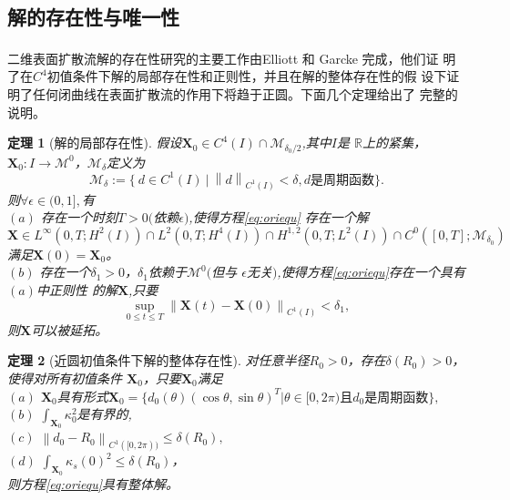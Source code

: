 \documentclass[a4paper,twoside]{ctexart}
\newtheorem{theorem}{定理}[section]
\begin{document}
\subsection{解的存在性与唯一性}
二维表面扩散流解的存在性研究的主要工作由Elliott 和 Garcke 完成\textsuperscript{\cite{ref1}}，他们证
明了在$C^4$初值条件下解的局部存在性和正则性，并且在解的整体存在性的假
设下证明了任何闭曲线在表面扩散流的作用下将趋于正圆。下面几个定理给出了
完整的说明。
\begin{theorem}[解的局部存在性]
  假设$\boldsymbol X_0\in C^4(I)\cap \mathcal{M}_{\delta_0/2}$,其中$I$是
  $\mathbb{R}$上的紧集，$\boldsymbol X_0:I\rightarrow \mathcal{M}^0$，$\mathcal{M}_{\delta}$定义为
  \begin{equation}
    \label{eq:mathcalM}
    \mathcal{M}_{\delta} := \{\ d \in C^1(I)\ |\ \left \|d  \right
    \|_{C^1(I)}<\delta ,  d \text{是周期函数}\}.
  \end{equation}
  则$\forall \epsilon \in (0,1],$有\\
  $(a)$ 存在一个时刻$T>0($依赖$\epsilon)$,使得方程\eqref{eq:oriequ}
  存在一个解
  \begin{equation}
    \boldsymbol X \in L^{\infty}(0,T;H^2(I))\cap L^{2}(0,T;H^4(I))\cap
    H^{1,2}(0,T;L^2(I))\cap C^{0}([0,T];\mathcal{M}_{\delta_0})
    \label{eq:exist}
  \end{equation}
  满足$\boldsymbol X(0) = \boldsymbol X_0$。\\
  $(b)$ 存在一个$\delta_1>0$，$\delta_1$依赖于$\mathcal{M}^0($但与
  $\epsilon$无关$)$,使得方程\eqref{eq:oriequ}存在一个具有$(a)$中正则性
  的解$\boldsymbol X$,只要
  $$\sup_{0\le t\le T}\left \|\boldsymbol X(t) - \boldsymbol X(0)  \right
  \|_{C^1(I)} < \delta_1,$$
  则$\boldsymbol X$可以被延拓。
\end{theorem}
\begin{theorem}[近圆初值条件下解的整体存在性]
  对任意半径$R_0>0$，存在$\delta(R_0)>0$，使得对所有初值条件
  $\boldsymbol X_0$，只要$\boldsymbol X_0$满足\\
  $(a)$ $\boldsymbol X_0$具有形式$\boldsymbol X_0 =
  \{d_0(\theta)(\cos{\theta},\sin{\theta})^T|\theta \in [0,2\pi)
   \text{且} d_0\text{是周期函数} \},$\\
  $(b)$ $\int_{\boldsymbol X_0}\kappa_0^2 $是有界的,\\
  $(c)$ $\left \|d_0 - R_0  \right \|_{C^1([0,2\pi))}\le \delta(R_0)
  ,$\\
  $(d)$ $\int_{\boldsymbol X_0}\kappa_s(0)^2 \le  \delta(R_0)$，\\
  则方程\eqref{eq:oriequ}具有整体解。
\end{theorem}
\end{document}
